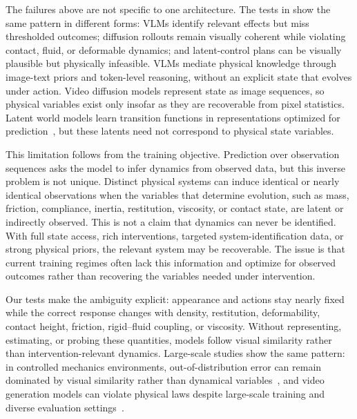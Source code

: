 \documentclass{article}
\begin{document}
The failures above are not specific to one architecture. The tests in  show the same pattern in different forms: VLMs identify relevant effects but miss thresholded outcomes; diffusion rollouts remain visually coherent while violating contact, fluid, or deformable dynamics; and latent-control plans can be visually plausible but physically infeasible. VLMs mediate physical knowledge through image-text priors and token-level reasoning, without an explicit state that evolves under action. Video diffusion models represent state as image sequences, so physical variables exist only insofar as they are recoverable from pixel statistics. Latent world models learn transition functions in representations optimized for prediction~\cite{ha2018world,ha2018recurrent,hafner2019learning,hafner2019dream,hafner2020dreamerv2,chen2022transdreamer,hafner2023mastering,deng2023s4wm,hafner2025mastering,schrittwieser2020muzero,micheli2022transformers,hansen2023tdmpc2}, but these latents need not correspond to physical state variables. 

This limitation follows from the training objective. Prediction over observation sequences asks the model to infer dynamics from observed data, but this inverse problem is not unique. Distinct physical systems can induce identical or nearly identical observations when the variables that determine evolution, such as mass, friction, compliance, inertia, restitution, viscosity, or contact state, are latent or indirectly observed. This is not a claim that dynamics can never be identified. With full state access, rich interventions, targeted system-identification data, or strong physical priors, the relevant system may be recoverable. The issue is that current training regimes often lack this information and optimize for observed outcomes rather than recovering the variables needed under intervention.

Our tests make the ambiguity explicit: appearance and actions stay nearly fixed while the correct response changes with density, restitution, deformability, contact height, friction, rigid--fluid coupling, or viscosity. Without representing, estimating, or probing these quantities, models follow visual similarity rather than intervention-relevant dynamics. Large-scale studies show the same pattern: in controlled mechanics environments, out-of-distribution error can remain dominated by visual similarity rather than dynamical variables~\cite{kang2024far}, and video generation models can violate physical laws despite large-scale training and diverse evaluation settings~\cite{meng2024towards,guo2025t2vphysbench,gu2025phyworldbench}.
\end{document}
